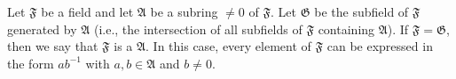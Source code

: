 Let $\mathfrak{F}$ be a field and let $\mathfrak{A}$ be a subring $\neq 0$ of $\mathfrak{F}$. Let $\mathfrak{G}$ be the subfield of $\mathfrak{F}$ generated by $\mathfrak{A}$ (i.e., the intersection of all subfields of $\mathfrak{F}$ containing $\mathfrak{A}$). If $\mathfrak{F} = \mathfrak{G}$, then we say that $\mathfrak{F}$ is a  $\mathfrak{A}$. In this case, every element of $\mathfrak{F}$ can be expressed in the form $ab^{-1}$ with $a, b \in \mathfrak{A}$ and $b \neq 0$.
